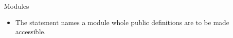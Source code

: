 \documentclass[10pt,t]{beamer}
\begin{document}
\begin{frame}{Modules}
\begin{itemize}
%  
      \item The  statement names a module whole public definitions are to be made accessible.

\end{itemize}
\end{frame}
\end{document}
